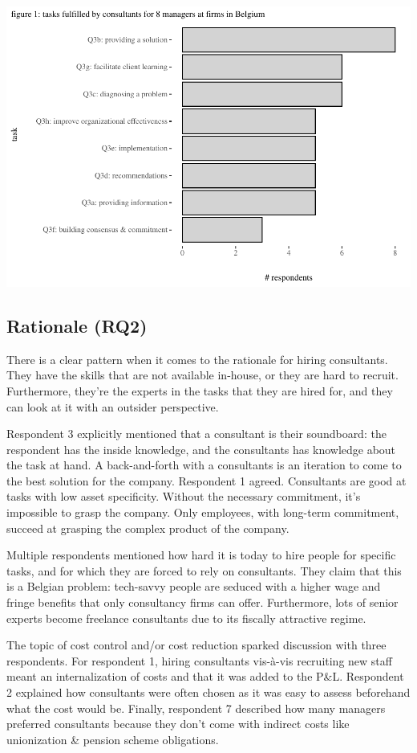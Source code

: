 \documentclass[12pt]{article}
\begin{document}
\includegraphics{2_ams_five_pager_files/figure-latex/unnamed-chunk-3-1.pdf}

\subsection{Rationale (RQ2)}\label{rationale-rq2}

There is a clear pattern when it comes to the rationale for hiring
consultants. They have the skills that are not available in-house, or
they are hard to recruit. Furthermore, they're the experts in the tasks
that they are hired for, and they can look at it with an outsider
perspective.

Respondent 3 explicitly mentioned that a consultant is their soundboard:
the respondent has the inside knowledge, and the consultants has
knowledge about the task at hand. A back-and-forth with a consultants is
an iteration to come to the best solution for the company. Respondent 1
agreed. Consultants are good at tasks with low asset specificity.
Without the necessary commitment, it's impossible to grasp the company.
Only employees, with long-term commitment, succeed at grasping the
complex product of the company.

Multiple respondents mentioned how hard it is today to hire people for
specific tasks, and for which they are forced to rely on consultants.
They claim that this is a Belgian problem: tech-savvy people are seduced
with a higher wage and fringe benefits that only consultancy firms can
offer. Furthermore, lots of senior experts become freelance consultants
due to its fiscally attractive regime.

The topic of cost control and/or cost reduction sparked discussion with
three respondents. For respondent 1, hiring consultants vis-à-vis
recruiting new staff meant an internalization of costs and that it was
added to the P\&L. Respondent 2 explained how consultants were often
chosen as it was easy to assess beforehand what the cost would be.
Finally, respondent 7 described how many managers preferred consultants
because they don't come with indirect costs like unionization \& pension
scheme obligations.
\end{document}

